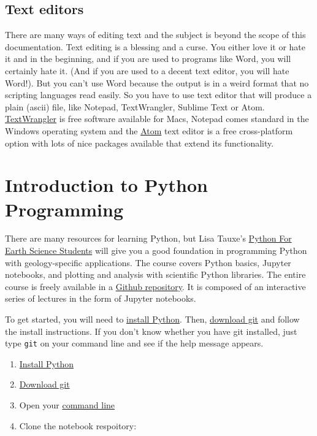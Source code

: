 \documentclass[11pt]{book}
\begin{document}
{{\section{Text editors}

There are many ways of editing text and the subject is beyond the scope of this documentation. Text editing is a blessing and a curse.  You either love it or
hate it and in the beginning, and if you are used to programs like Word, you will certainly hate it. (And if you are used to a decent text editor, you will hate Word!).      But you can't use Word because the output is in a weird format that no scripting languages read easily.  So you have to use text editor that will produce a plain (ascii) file, like Notepad, TextWrangler, Sublime Text or Atom.  \href{http://textwrangler.onfreedownload.com}{TextWrangler} is free software available for Macs, Notepad comes standard in the Windows operating system and the \href{https://atom.io}{Atom} text editor is a free cross-platform option with lots of nice packages available that extend its functionality.



\chapter{Introduction to Python Programming}
\label{chap:python}

There are many resources for learning Python, but Lisa Tauxe's \href{https://github.com/ltauxe/Python-for-Earth-Science-Students}{Python For Earth Science Students} will give you a good foundation in programming Python with geology-specific applications.  The course covers Python basics, Jupyter notebooks, and plotting and analysis with scientific Python libraries.  The entire course is freely available in a \href{https://github.com/ltauxe/Python-for-Earth-Science-Students}{Github repository}.  It is composed of an interactive series of lectures in the form of Jupyter notebooks.

To get started, you will need to \href{#getting_python}{install Python}.  Then, \href{https://git-scm.com/downloads}{download git} and follow the install instructions.  If you don't know whether you have git installed, just type \verb!git! on your command line and see if the help message appears.

\begin{enumerate}
\item \href{#getting_python}{Install Python}
\item \href{https://git-scm.com/downloads}{Download git}
\item Open your \href{#command_line}{command line}
\item Clone the notebook respoitory:
\begin{verbatim}


\end{verbatim}
\end{enumerate}}}
\end{document}
